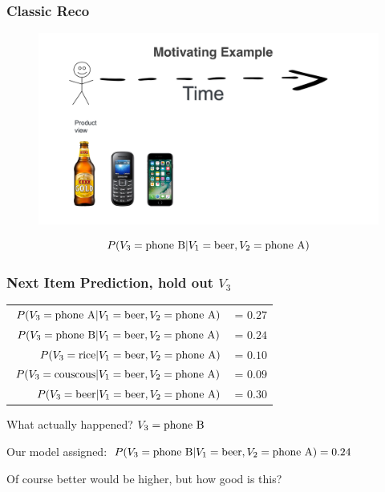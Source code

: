 \begin{frame}
  \frametitle{Classic Reco}
 
 
   \begin{figure}[h!]
     \includegraphics[scale=0.25]{images/mot_ex1cc.png}
       \centering
       \label{motex1}
   \end{figure}

   \[
   P(V_3 = {\rm phone ~ B} | V_1 = {\rm beer}, V_2 = {\rm phone ~ A} )  
   \]

   
 \end{frame}



 \begin{frame}
  \frametitle{Next Item Prediction, hold out $V_3$}

  \begin{tabular}{r r}
    $P(V_3 = {\rm phone ~ A} | V_1 = {\rm beer}, V_2 = {\rm phone ~ A} )$ &= $0.27$ \\
    $P(V_3 = {\rm phone ~ B} | V_1 = {\rm beer}, V_2 = {\rm phone ~ A} )$ &= $0.24$ \\
    $P(V_3 = {\rm rice} | V_1 = {\rm beer}, V_2 = {\rm phone ~ A} )$ &= $0.10$ \\
    $P(V_3 = {\rm couscous} | V_1 = {\rm beer}, V_2 = {\rm phone ~ A} )$ &= $0.09$ \\
    $P(V_3 = {\rm beer} | V_1 = {\rm beer}, V_2 = {\rm phone ~ A} )$ &= $0.30$ \\
  \end{tabular}


\vspace{4mm}  
  \pause
What actually happened? \pause $V_3 = {\rm phone ~ B} $

\vspace{4mm}  
  \pause
Our model assigned: $P(V_3 = {\rm phone ~ B} | V_1 = {\rm beer}, V_2 = {\rm phone ~ A}) = 0.24$ 

\pause
Of course better would be higher, but how good is this?

 \end{frame}



